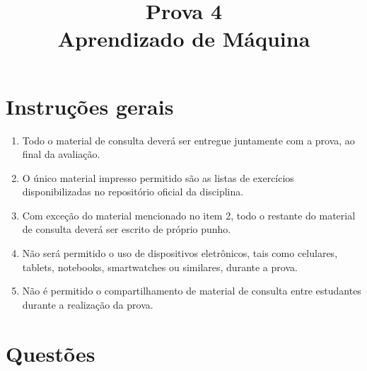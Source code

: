\documentclass[9pt,a4paper]{extarticle}
\begin{document}
\title{\vspace{-1em}Prova 4\\
Aprendizado de Máquina}
\date{}
\maketitle

\vspace{-2cm}

\section*{Instruções gerais}
\begin{enumerate}
\item Todo o material de consulta deverá ser entregue juntamente com a prova, ao final da avaliação.
\item O único material impresso permitido são as listas de exercícios disponibilizadas no repositório oficial da disciplina.
\item Com exceção do material mencionado no item 2, todo o restante do material de consulta deverá ser escrito de próprio punho.
\item Não será permitido o uso de dispositivos eletrônicos, tais como celulares, tablets, notebooks, smartwatches ou similares, durante a prova.
\item Não é permitido o compartilhamento de material de consulta entre estudantes durante a realização da prova.
\end{enumerate}

\section*{Questões}
\end{document}
